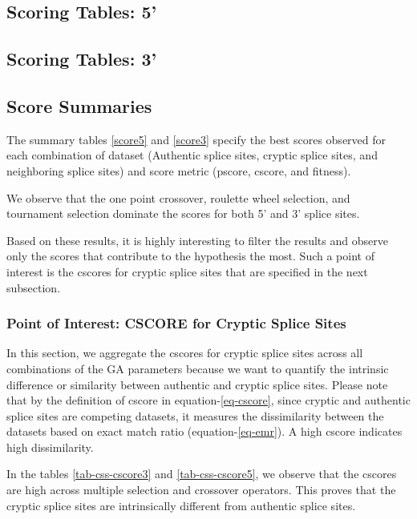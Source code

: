 \documentclass[12pt,a4paper]{article}
\begin{document}
	\subsection{Scoring Tables: 5'}
	
	\subsection{Scoring Tables: 3'}
	

	\subsection{Score Summaries} 
	
	
	
	The summary tables \ref{score5} and \ref{score3} specify the best scores observed for each combination of dataset (Authentic splice sites, cryptic splice sites, and neighboring splice sites) and score metric (pscore, cscore, and fitness). \par
	We observe that the one point crossover, roulette wheel selection, and tournament selection dominate the scores for both 5' and 3' splice sites. \par
	Based on these results, it is highly interesting to filter the results and observe only the scores that contribute to the hypothesis the most. Such a point of interest is the cscores for cryptic splice sites that are specified in the next subsection.
	
	\subsubsection{Point of Interest: CSCORE for Cryptic Splice Sites}
	
	In this section, we aggregate the cscores for cryptic splice sites across all combinations of the GA parameters because we want to quantify the intrinsic difference or similarity between authentic and cryptic splice sites. Please note that by the definition of cscore in equation-\ref{eq-cscore}, since cryptic and authentic splice sites are competing datasets, it measures the dissimilarity between the datasets based on exact match ratio (equation-\ref{eq-emr}). A high cscore indicates high dissimilarity.
	
	
	
	In the tables \ref{tab-css-cscore3} and \ref{tab-css-cscore5}, we observe that the cscores are high across multiple selection and crossover operators. This proves that the cryptic splice sites are intrinsically different from authentic splice sites.
	
\end{document}
